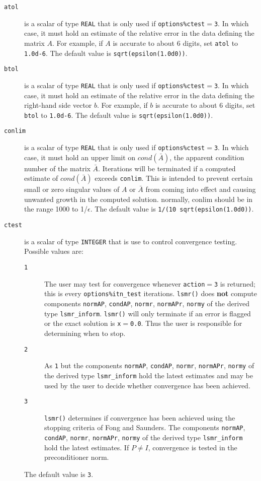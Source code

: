 \begin{description}

\item[\texttt{atol}] is a scalar of type {\tt REAL} that is only used if
   {\tt options\%ctest}$ =${\tt 3}.
   In which case, it must hold an estimate of the relative error in the data
   defining the matrix $A$.  For example, if $A$ is accurate to about 6 digits,
   set {\tt atol} to {\tt 1.0d-6}. The default value is {\tt sqrt(epsilon(1.0d0))}.

\item[\texttt{btol}] is a scalar of type {\tt REAL} that is only used if
   {\tt options\%ctest}$ =${\tt 3}.
   In which case, it must hold an estimate of the relative error in the data
   defining the right-hand side vector $ b$.  For example, if $b$ is
   accurate to about 6 digits, set {\tt btol} to {\tt 1.0d-6}. The default value is 
   {\tt sqrt(epsilon(1.0d0))}.


\item[\texttt{conlim}] is a scalar of type {\tt REAL} that is only used if
   {\tt options\%ctest}$ =${\tt 3}.
   In which case, it must hold an upper limit on $cond(\bar{A})$, the apparent
   condition number of the matrix $\bar{A}$. Iterations will be terminated 
   if a computed estimate of $cond(\bar{A})$ exceeds {\tt conlim}.
   This is intended to prevent certain small or
   zero singular values of $A$ or $\bar{A}$ from
   coming into effect and causing unwanted growth in the computed solution.
   normally, conlim should be in the range 1000 to 1/$\epsilon$.
   The default value is {\tt 1/(10 sqrt(epsilon(1.0d0))}.

\item[\texttt{ctest}] is a scalar of type {\tt INTEGER} that is use to control
   convergence testing. Possible values are:
   \begin{description}
   \item[\texttt{1}] The user may test for convergence whenever 
      {\tt action}$ = ${\tt 3} is returned; this is
      every {\tt options\%itn\_test} iterations.
      {\tt lsmr()} does {\bf not} compute components
      {\tt normAP}, {\tt condAP}, {\tt normr}, {\tt normAPr}, {\tt normy}
      of the derived type {\tt lsmr\_inform}.
      {\tt lsmr()} will only terminate if an  error is flagged
      or the exact solution is {\tt x}$ = ${\tt 0.0}.
      Thus the user is responsible for determining when to stop.
   \item[\texttt{2}] As {\texttt 1} but the components
      {\tt normAP}, {\tt condAP}, {\tt normr}, {\tt normAPr}, {\tt normy}
      of the derived type {\tt lsmr\_inform} hold the latest estimates and
      may be used by the user to decide whether convergence has been achieved.
   \item[\texttt{3}] {\tt lsmr()} determines if convergence has been achieved
      using the stopping criteria of Fong and Saunders. The components
      {\tt normAP}, {\tt condAP}, {\tt normr}, {\tt normAPr}, {\tt normy}
      of the derived type {\tt lsmr\_inform} hold the latest estimates.
      If $P \neq I$,  convergence is tested in the
      preconditioner norm.
   \end{description}
   The default value is {\tt 3}.


\end{description}
